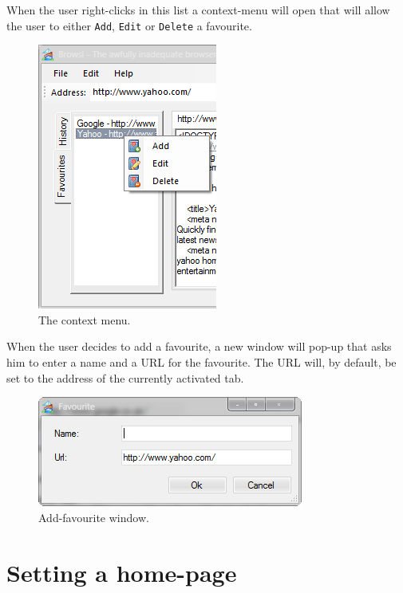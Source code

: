 When the user right-clicks in this list a context-menu will open that will allow the user to either \texttt{Add}, \texttt{Edit} or \texttt{Delete} a favourite.

\begin{figure}[H]
\begin{center}
\includegraphics[scale=1]{gfx/context_menu.png}
\caption{The context menu.}
\label{fig:context_menu}
\end{center}
\end{figure}

When the user decides to add a favourite, a new window will pop-up that asks him to enter a name and a \ac{URL} for the favourite. The \ac{URL} will, by default, be set to the address of the currently activated tab.

\begin{figure}[H]
\begin{center}
\includegraphics[scale=1]{gfx/add_favourite.png}
\caption{Add-favourite window.}
\label{fig:add_favourite}
\end{center}
\end{figure}

\section{Setting a home-page}
\label{sec:setting_home_page}

